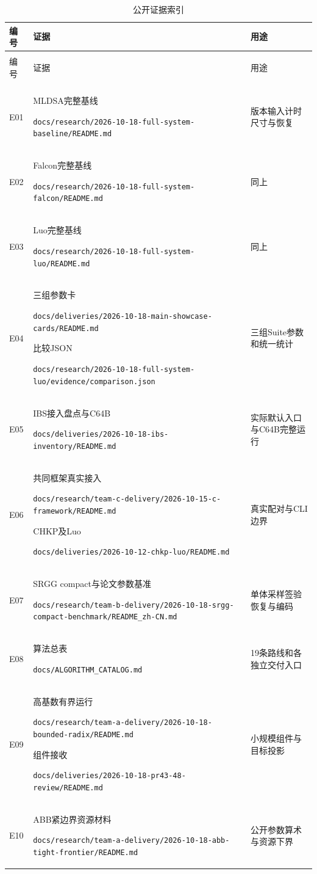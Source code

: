\documentclass[UTF8,a4paper,12pt,oneside,openany,fontset=fandol]{ctexrep}
\renewcommand{\arraystretch}{1.25}
\newcommand{\evidenceitem}[2]{\noindent #1\par{\noindent\scriptsize\color{black!70}\nolinkurl{#2}\par}\smallskip}
\newlength{\tableavail}
\begin{document}
\begingroup
\small
\renewcommand{\arraystretch}{1.08}
\setlength{\LTpre}{5pt}
\setlength{\LTpost}{5pt}
\setlength{\tableavail}{\dimexpr\textwidth-4\tabcolsep\relax}
\begin{longtable}{@{}>{\raggedright\arraybackslash}p{0.09\tableavail}>{\raggedright\arraybackslash}p{0.55\tableavail}>{\raggedright\arraybackslash}p{0.36\tableavail}@{}}
\caption{公开证据索引}\label{tab:evidence-index}\\
\toprule
\rowcolor{black!8} 编号 & 证据 & 用途 \\
\midrule
\endfirsthead
\multicolumn{3}{l}{\small 表\thetable\quad 续表}\\
\toprule
\rowcolor{black!8} 编号 & 证据 & 用途 \\
\midrule
\endhead
\midrule
\multicolumn{3}{r}{\small 接下页}\\
\endfoot
\bottomrule
\endlastfoot
E01 & \evidenceitem{MLDSA完整基线}{docs/research/2026-10-18-full-system-baseline/README.md} & 版本输入计时尺寸与恢复 \\
E02 & \evidenceitem{Falcon完整基线}{docs/research/2026-10-18-full-system-falcon/README.md} & 同上 \\
E03 & \evidenceitem{Luo完整基线}{docs/research/2026-10-18-full-system-luo/README.md} & 同上 \\
E04 & \evidenceitem{三组参数卡}{docs/deliveries/2026-10-18-main-showcase-cards/README.md}\evidenceitem{比较JSON}{docs/research/2026-10-18-full-system-luo/evidence/comparison.json} & 三组Suite参数和统一统计 \\
E05 & \evidenceitem{IBS接入盘点与C64B}{docs/deliveries/2026-10-18-ibs-inventory/README.md} & 实际默认入口与C64B完整运行 \\
E06 & \evidenceitem{共同框架真实接入}{docs/research/team-c-delivery/2026-10-15-c-framework/README.md}\evidenceitem{CHKP及Luo}{docs/deliveries/2026-10-12-chkp-luo/README.md} & 真实配对与CLI边界 \\
E07 & \evidenceitem{SRGG compact与论文参数基准}{docs/research/team-b-delivery/2026-10-18-srgg-compact-benchmark/README_zh-CN.md} & 单体采样签验恢复与编码 \\
E08 & \evidenceitem{算法总表}{docs/ALGORITHM_CATALOG.md} & 19条路线和各独立交付入口 \\
E09 & \evidenceitem{高基数有界运行}{docs/research/team-a-delivery/2026-10-18-bounded-radix/README.md}\evidenceitem{组件接收}{docs/deliveries/2026-10-18-pr43-48-review/README.md} & 小规模组件与目标投影 \\
E10 & \evidenceitem{ABB紧边界资源材料}{docs/research/team-a-delivery/2026-10-18-abb-tight-frontier/README.md} & 公开参数算术与资源下界 \\

\end{longtable}
\end{document}
